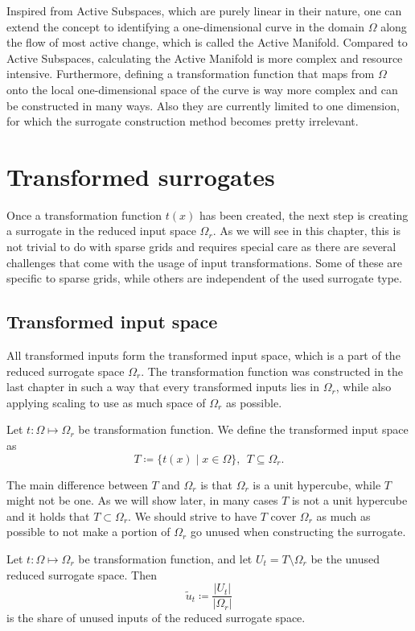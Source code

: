 \documentclass[
  a4paper,  %
  twoside,  %
  bibliography=totoc,
  headsepline,
  cleardoublepage=empty,
  parskip=half,
  draft=false
]{scrbook}
\begin{document}
Inspired from Active Subspaces, which are purely linear in their nature, one can extend the concept to identifying a one-dimensional curve in the domain $\Omega$ along the flow of most active change, which is called the Active Manifold.
Compared to Active Subspaces, calculating the Active Manifold is more complex and resource intensive.
Furthermore, defining a transformation function that maps from $\Omega$ onto the local one-dimensional space of the curve is way more complex and can be constructed in many ways.
Also they are currently limited to one dimension, for which the surrogate construction method becomes pretty irrelevant.


\chapter{Transformed surrogates}
\label{chap:c4}

Once a transformation function $t(x)$ has been created, the next step is creating a surrogate in the reduced input space $\Omega_r$.
As we will see in this chapter, this is not trivial to do with sparse grids and requires special care as there are several challenges that come with the usage of input transformations.
Some of these are specific to sparse grids, while others are independent of the used surrogate type.

\section{Transformed input space}

All transformed inputs form the transformed input space, which is a part of the reduced surrogate space $\Omega_r$.
The transformation function was constructed in the last chapter in such a way that every transformed inputs lies in $\Omega_r$, while also applying scaling to use as much space of $\Omega_r$ as possible.
\begin{definition}
Let $t \colon \Omega \mapsto \Omega_r$ be transformation function.
We define the transformed input space as
\begin{equation}
T \coloneqq \{t(x) \mid x \in\Omega\}, ~~ T \subseteq \Omega_r.
\end{equation}
\end{definition}

The main difference between $T$ and $\Omega_r$ is that $\Omega_r$ is a unit hypercube, while $T$ might not be one.
As we will show later, in many cases $T$ is not a unit hypercube and it holds that $T \subset \Omega_r$.
We should strive to have $T$ cover $\Omega_r$ as much as possible to not make a portion of $\Omega_r$ go unused when constructing the surrogate.
\begin{definition}
Let $t \colon \Omega \mapsto \Omega_r$ be transformation function, and let $U_t=T \setminus \Omega_r$ be the unused reduced surrogate space.
Then
\begin{equation}
\tilde{u}_t \coloneqq \frac{|U_t|}{|\Omega_r|}
\end{equation}
is the share of unused inputs of the reduced surrogate space.
\end{definition}
\end{document}
